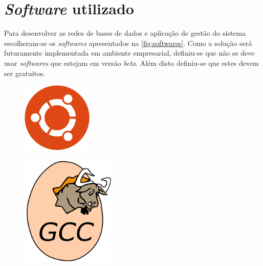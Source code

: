 \documentclass[11pt,twoside,a4paper]{report}
\begin{document}

\newpage
\section{\textit{Software} utilizado}
Para desenvolver as redes de bases de dados e aplicação de gestão do sistema escolheram-se os \textit{softwares} apresentados na \autoref{fig:softwares}. Como a solução será futuramente implementada em ambiente empresarial, definiu-se que não se deve usar \textit{softwares} que estejam em versão \textit{beta}. Além disto definiu-se que estes devem ser gratuitos.
\begin{figure}[H]
	\centering
	\begin{minipage}{0.33\textwidth}
		\vspace{0.88cm}
		\begin{center}
			\includegraphics[width=0.3\textwidth]{ubuntu} %
			\label{fig:linux}
		\end{center}
	\end{minipage}%
	\begin{minipage}{0.33\textwidth}
		\begin{center}
			\includegraphics[width=0.4\textwidth]{gcc} %

\end{center}
\end{minipage}
\end{figure}
\end{document}
